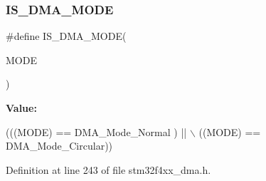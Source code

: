 \subsubsection{\texorpdfstring{I\+S\+\_\+\+D\+M\+A\+\_\+\+M\+O\+DE}{IS\_DMA\_MODE}}
{\footnotesize\ttfamily \#define I\+S\+\_\+\+D\+M\+A\+\_\+\+M\+O\+DE(\begin{DoxyParamCaption}\item[{}]{M\+O\+DE }\end{DoxyParamCaption})}

{\bfseries Value\+:}
\begin{DoxyCode}
(((MODE) == DMA\_Mode\_Normal ) || \(\backslash\)
                           ((MODE) == DMA\_Mode\_Circular))
\end{DoxyCode}


Definition at line 243 of file stm32f4xx\+\_\+dma.\+h.

